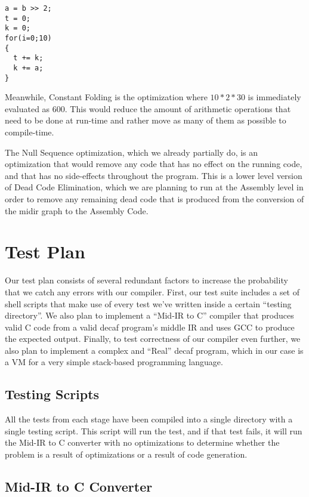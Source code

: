 \documentclass[11pt]{article}
\begin{document}
\begin{verbatim}
a = b >> 2;
t = 0;
k = 0;
for(i=0;10)
{
  t += k;
  k += a;
}
\end{verbatim}

Meanwhile, Constant Folding is the optimization where $10*2*30$ is
immediately evaluated as $600$. This would reduce the amount of
arithmetic operations that need to be done at run-time and rather move
as many of them as possible to compile-time.

The Null Sequence optimization, which we already partially do, is an
optimization that would remove any code that has no effect on the
running code, and that has no side-effects throughout the
program. This is a lower level version of Dead Code Elimination, which
we are planning to run at the Assembly level in order to remove any
remaining dead code that is produced from the conversion of the midir
graph to the Assembly Code.

\section {Test Plan}
\label{sec:test}

Our test plan consists of several redundant factors to increase the
probability that we catch any errors with our compiler. First, our
test suite includes a set of shell scripts that make use of every test
we've written inside a certain ``testing directory''. We also plan to
implement a ``Mid-IR to C'' compiler that produces valid C code from a
valid decaf program's middle IR and uses GCC to produce the expected
output. Finally, to test correctness of our compiler even further, we
also plan to implement a complex and ``Real'' decaf program, which in
our case is a VM for a very simple stack-based programming language.

\subsection {Testing Scripts}

All the tests from each stage have been compiled into a single
directory with a single testing script. This script will run the test,
and if that test fails, it will run the Mid-IR to C converter with no
optimizations to determine whether the problem is a result of
optimizations or a result of code generation. 

\subsection {Mid-IR to C Converter} 
\end{document}
